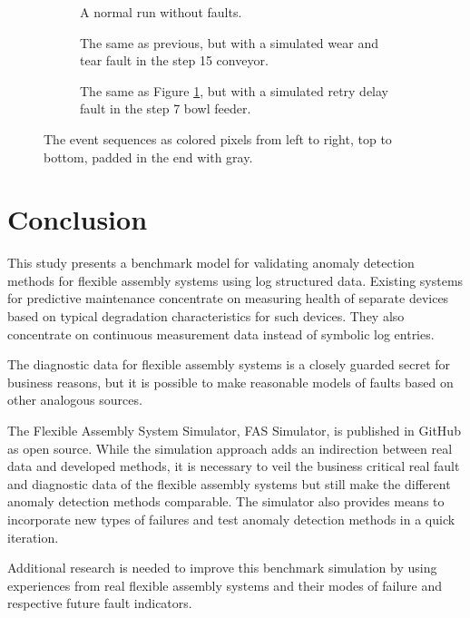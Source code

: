 \documentclass[procedia]{easychair}
\begin{document}
\begin{figure}[tb]
\begin{subfigure}[h]{0.32\linewidth}
 \resizebox{\linewidth}{!}{}
 \caption{A normal run without faults.\newline\newline}
 \label{figure:output_easy}
\end{subfigure}
\begin{subfigure}[h]{0.32\linewidth}
 \resizebox{\linewidth}{!}{}
 \caption{The same as previous, but with a simulated wear and tear fault in the step 15 conveyor.}
 \label{figure:output_easy_wear_and_tear}
\end{subfigure}
\begin{subfigure}[h]{0.32\linewidth}
 \resizebox{\linewidth}{!}{}
 \caption{The same as Figure \ref{figure:output_easy}, but with a simulated retry delay fault in the step 7 bowl feeder.}
 \label{figure:output_easy_retry_delay}
\end{subfigure}
 \caption{The event sequences as colored pixels from left to right, top to bottom, padded in the end with gray.}
 \label{figure:output_images}
\end{figure}

\section{Conclusion}

This study presents a benchmark model for validating anomaly detection methods for flexible assembly systems using log structured data.
Existing systems for predictive maintenance concentrate on measuring health of separate devices based on typical degradation characteristics
for such devices. They also concentrate on continuous measurement data instead of symbolic log entries.

The diagnostic data for flexible assembly systems is a closely guarded secret for business reasons, but it is possible to make reasonable models
of faults based on other analogous sources.

The Flexible Assembly System Simulator, FAS Simulator, is published in GitHub \cite{FASSimulator} as open source. While the simulation
approach adds an indirection between real data and developed methods, it is necessary to veil the business critical real fault and diagnostic
data of the flexible assembly systems but still make the different anomaly detection methods comparable. The simulator also provides means to incorporate new types of
failures and test anomaly detection methods in a quick iteration.

Additional research is needed to improve this benchmark simulation by using experiences from real flexible assembly systems and their modes of failure
and respective future fault indicators.

\label{sect:bib}



\appendix
\end{document}
